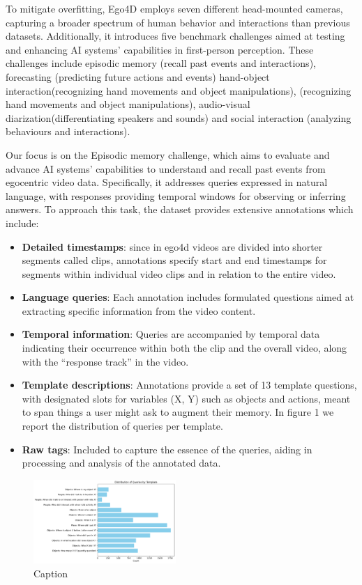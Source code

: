 \documentclass[conference]{IEEEtran}
\begin{document}
To mitigate overfitting, Ego4D employs seven different head-mounted cameras, capturing a broader spectrum of human behavior and interactions than previous datasets. Additionally, it introduces five benchmark challenges aimed at testing and enhancing AI systems' capabilities in first-person perception. These challenges include episodic memory (recall past events and interactions), forecasting (predicting future actions and events) hand-object interaction(recognizing hand movements and object manipulations), (recognizing hand movements and object manipulations), audio-visual diarization(differentiating speakers and sounds) and social interaction (analyzing behaviours and interactions). 

Our focus is on the Episodic memory challenge, which aims to evaluate and advance AI systems’ capabilities to understand and recall past events from egocentric video data. Specifically, it addresses queries expressed in natural language, with responses providing temporal windows for observing or inferring answers. To approach this task, the dataset provides extensive annotations which include:

\begin{itemize}
    \item \textbf{Detailed timestamps}: since in ego4d videos are divided into shorter segments called clips, annotations specify start and end timestamps for segments within individual video clips and in relation to the entire video.
    \item \textbf{Language queries}: Each annotation includes formulated questions aimed at extracting specific information from the video content.
    \item \textbf{Temporal information}: Queries are accompanied by temporal data indicating their occurrence within both the clip and the overall video, along with the “response track” in the video.
    \item \textbf{Template descriptions}: Annotations provide a set of 13 template questions, with designated slots for variables (X, Y) such as objects and actions, meant to span things a user might ask to augment their memory. In figure 1 we report the distribution of queries per template.
    \item \textbf{Raw tags}: Included to capture the essence of the queries, aiding in processing and analysis of the annotated data.
\end{itemize}

\begin{figure}[h]
\centering
\includegraphics[width=0.48\textwidth]{Figure1.pdf} %
\caption{Caption}
\label{fig:figure2}
\end{figure}
\end{document}
